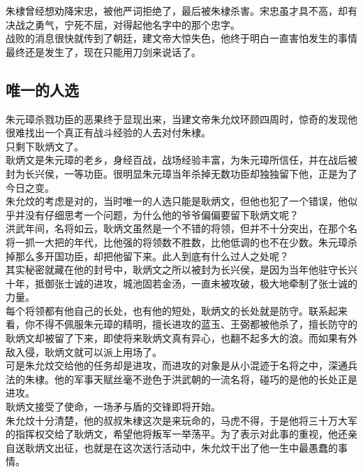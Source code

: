 \begin{multicols}{\theparacolNo}
朱棣曾经想劝降宋忠，被他严词拒绝了，最后被朱棣杀害。宋忠虽才具不高，却有决战之勇气，宁死不屈，对得起他名字中的那个忠字。\\

战败的消息很快就传到了朝廷，建文帝大惊失色，他终于明白一直害怕发生的事情最终还是发生了，现在只能用刀剑来说话了。\\

\subsection{唯一的人选}
朱元璋杀戮功臣的恶果终于显现出来，当建文帝朱允炆环顾四周时，惊奇的发现他很难找出一个真正有战斗经验的人去对付朱棣。\\

只剩下耿炳文了。\\

耿炳文是朱元璋的老乡，身经百战，战场经验丰富，为朱元璋所信任，并在战后被封为长兴侯，一等功臣。很明显朱元璋当年杀掉无数功臣却独独留下他，正是为了今日之变。\\

朱允炆的考虑是对的，当时唯一的人选只能是耿炳文，但他也犯了一个错误，他似乎并没有仔细思考一个问题，为什么他的爷爷偏偏要留下耿炳文呢？\\

洪武年间，名将如云，耿炳文虽然是一个不错的将领，但并不十分突出，在那个名将一抓一大把的年代，比他强的将领数不胜数，比他低调的也不在少数。朱元璋杀掉那么多开国功臣，却把他留下来。此人到底有什么过人之处呢？\\

其实秘密就藏在他的封号中，耿炳文之所以被封为长兴侯，是因为当年他驻守长兴十年，抵御张士诚的进攻，城池固若金汤，一直未被攻破，极大地牵制了张士诚的力量。\\

每个将领都有他自己的长处，也有他的短处，耿炳文的长处就是防守。联系起来看，你不得不佩服朱元璋的精明，擅长进攻的蓝玉、王弼都被他杀了，擅长防守的耿炳文却被留了下来，即使将来耿炳文真有异心，也翻不起多大的浪。而如果有外敌入侵，耿炳文就可以派上用场了。\\

可是朱允炆交给他的任务却是进攻，而进攻的对象是从小混迹于名将之中，深通兵法的朱棣。他的军事天赋丝毫不逊色于洪武朝的一流名将，碰巧的是他的长处正是进攻。\\

耿炳文接受了使命，一场矛与盾的交锋即将开始。\\

朱允炆十分清楚，他的叔叔朱棣这次是来玩命的，马虎不得，于是他将三十万大军的指挥权交给了耿炳文，希望他将叛军一举荡平。为了表示对此事的重视，他还亲自送耿炳文出征，也就是在这次送行活动中，朱允炆干出了他一生中最愚蠢的事情。\\


\end{multicols}

